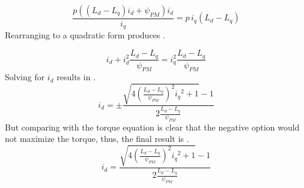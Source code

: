 \begin{equation}
	\frac{p((L_d - L_q)i_d + \psi_{PM}) i_d}{i_q}  = p\,i_q(L_d - L_q)
	\label{eq:mpta_intermediary}
\end{equation}
Rearranging to a quadratic form produces .

\begin{equation}
	i_d+i_d^2\frac{L_d - L_q}{\psi_{PM}} = i_q^2\frac{L_d - L_q}{\psi_{PM}}
	\label{eq:mpta_intermediary2}
\end{equation}
Solving for $i_d$ results in .
\begin{equation}
	i_d = \pm\frac{\sqrt{4 {\left(\frac{L_d - L_q}{\psi_{PM}}\right)}^2 {i_q}^2 +1}-1}{2\frac{L_d - L_q}{\psi_{PM}}}
	\label{eq:mpta_intermediary3}
\end{equation}
But comparing with the torque equation is clear that the negative option would not maximize the torque, thus, the final result is .
\begin{equation}
	i_d = \frac{\sqrt{4 {\left(\frac{L_d - L_q}{\psi_{PM}}\right)}^2 {i_q}^2 +1}-1}{2\frac{L_d - L_q}{\psi_{PM}}}
	\label{eq:mtpa_ref}
\end{equation}

